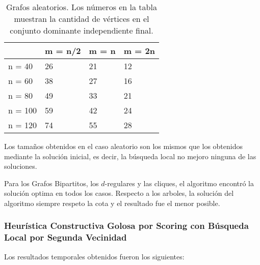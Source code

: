 \begin{table}[H]
\centering
\label{my-label}
\begin{tabular}{|l|lll|}
\hline
        & \multicolumn{1}{l|}{m = n/2} & \multicolumn{1}{l|}{m = n} & m = 2n \\ \hline
n = 40  & 26                           & 21                         & 12     \\ \cline{1-1}
n = 60  & 38                           & 27                         & 16     \\ \cline{1-1}
n = 80  & 49                           & 33                         & 21     \\ \cline{1-1}
n = 100 & 59                           & 42                         & 24     \\ \cline{1-1}
n = 120 & 74                           & 55                         & 28     \\ \hline
\end{tabular}
\caption{Grafos aleatorios. Los números en la tabla muestran la cantidad de vértices en el conjunto dominante independiente final.}
\end{table}

Los tamaños obtenidos en el caso aleatorio son los mismos que los obtenidos mediante la solución inicial, es decir, la búsqueda local no mejoro ninguna de las soluciones.

Para los Grafos Bipartitos, los $d$-regulares y las cliques, el algoritmo encontró la solución optima en todos los casos. Respecto a los arboles, la solución del algoritmo siempre respeto la cota y el resultado fue el menor posible.

\subsubsection{Heurística Constructiva Golosa por Scoring con Búsqueda Local por Segunda Vecinidad}

Los resultados temporales obtenidos fueron los siguientes:

